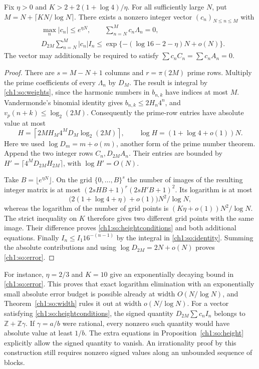 \documentclass[11pt,a4paper,oneside,openany]{report}
\theoremstyle{remark}\newtheorem{remark}[theorem]{Remark}
\numberwithin{equation}{section}
\begin{document}
\begin{proposition}\label{ch1:so:height}
Fix $\eta>0$ and $K>2+2(1+\log4)/\eta$. For all sufficiently large
$N$, put $M=N+\lceil K N/\log N\rceil$. There exists a nonzero
integer vector $(c_n)_{N\le n\le M}$ with
\begin{align}
 &\max_n |c_n|\le e^{\eta N},\qquad \sum_{n=N}^M c_n \Lambda_n=0,
 \label{ch1:so:heightconditions}\\
 &D_{2M}\sum_{n=N}^M |c_n| I_n
 \le \exp\{-(\log16-2-\eta)N+o(N)\}. \label{ch1:so:error}
\end{align}
The vector may additionally be required to satisfy
$\sum c_n C_n=\sum c_n A_n=0$.
\end{proposition}

\begin{proof}
There are $s=M-N+1$ columns and $r=\pi(2M)$ prime rows. Multiply
the prime coefficients of every $\Lambda_n$ by $D_M$. The result is
integral by \eqref{ch1:so:weights}, since the harmonic numbers in
$b_{n,k}$ have indices at most $M$. Vandermonde's binomial identity
gives $b_{n,k}\le2H_n4^n$, and $v_p(n+k)\le\log_2(2M)$.
Consequently the prime-row entries have absolute value at most
\[
 H=\left\lceil 2M H_M 4^M D_M \log_2(2M)\right\rceil ,
 \qquad \log H=(1+\log4+o(1))N.
\]
Here we used $\log D_m=m+o(m)$, another form of the prime number
theorem. Append the two integer rows $C_n,D_{2M}A_n$. Their entries
are bounded by $H'=\lceil 4^M D_{2M}H_{2M}\rceil$, with
$\log H'=O(N)$.

Take $B=\lfloor e^{\eta N}\rfloor$. On the grid $\{0,\ldots,B\}^s$
the number of images of the resulting integer matrix is at most
$(2sHB+1)^r(2sH'B+1)^2$. Its logarithm is at most
\[
 \bigl(2(1+\log4+\eta)+o(1)\bigr)N^2/\log N ,
\]
whereas the logarithm of the number of grid points is
$(K\eta+o(1))N^2/\log N$. The strict inequality on $K$ therefore
gives two different grid points with the same image. Their difference
proves \eqref{ch1:so:heightconditions} and both additional equations.
Finally $I_n\le I_1 16^{-(n-1)}$ by the integral in
\eqref{ch1:so:identity}. Summing the absolute contributions and using
$\log D_{2M}=2N+o(N)$ proves \eqref{ch1:so:error}.
\end{proof}

For instance, $\eta=2/3$ and $K=10$ give an exponentially decaying
bound in \eqref{ch1:so:error}. This proves that exact logarithm
elimination with an exponentially small absolute error budget is
possible already at width $O(N/\log N)$, and Theorem~\ref{ch1:so:width}
rules it out at width $o(N/\log N)$.
For a vector satisfying \eqref{ch1:so:heightconditions}, the signed
quantity $D_{2M}\sum c_nI_n$ belongs to $\mathbb Z+\mathbb Z\gamma$.
If $\gamma=a/b$ were rational, every nonzero such quantity would
have absolute value at least $1/b$. The extra equations in
Proposition~\ref{ch1:so:height} explicitly allow the signed quantity
to vanish. An irrationality proof by this construction still requires
nonzero signed values along an unbounded sequence of blocks.
\end{document}
